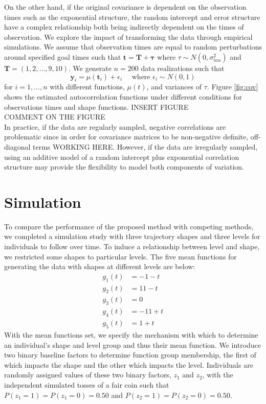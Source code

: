 \documentclass[12pt]{article}
\newcommand{\B}[0]{\mathbf}
\begin{document}
On the other hand, if the original covariance is dependent on the observation times such as the exponential structure, the random intercept and error structure have a complex relationship both being indirectly dependent on the times of observation. We explore the impact of transforming the data through empirical simulations. We assume that observation times are equal to random perturbations around specified goal times such that $\B t = \B T + \B \tau$ where $\tau\sim N(0,\sigma^{2}_{tau})$ and $\B T = (1,2,...,9,10)$. We generate $n=200$ data realizations such that
$$\B y_{i} = \mu(\B t_{i}) + \epsilon_{i}\quad\text{ where }\epsilon_{i}\sim N(0,1)$$
for $i=1,...,n$ with different functions, $\mu(t)$, and variances of $\tau$. Figure \ref{fig:cov} shows the estimated autocorrelation functions under different conditions for observations times and shape functions.
INSERT FIGURE\\
COMMENT ON THE FIGURE\\
In practice, if the data are regularly sampled, negative correlations are problematic since in order for covariance matrices to be non-negative definite, off-diagonal terms WORKING HERE. However, if the data are irregularly sampled, using an additive model of a random intercept plus exponential correlation structure  \cite{diggle2002} may provide the flexibility to model both components of variation. 

\section{Simulation}
To compare the performance of the proposed method with competing methods, we completed a simulation study with three trajectory shapes and three levels for individuals to follow over time. To induce a relationship between level and shape, we restricted some shapes to particular levels. The five mean functions for generating the data with shapes at different levels are below:   \begin{align*}
g_{1}(t) &= -1 - t\\
g_{2}(t) &= 11 - t\\
g_{3}(t) &= 0\\
g_{4}(t) &= -11 + t\\
g_{5}(t) &= 1 + t
\end{align*} 
With the mean functions set, we specify the mechanism with which to determine an individual's shape and level group and thus their mean function. We introduce two binary baseline factors to determine function group membership, the first of which impacts the shape and the other which impacts the level. Individuals are randomly assigned values of these two binary factors, $z_{1}$ and $z_{2}$, with the independent simulated tosses of a fair coin such that $P(z_{1}=1) = P(z_{1}=0) = 0.50$ and $P(z_{2}=1) = P(z_{2}=0)=0.50$. \\
\end{document}
